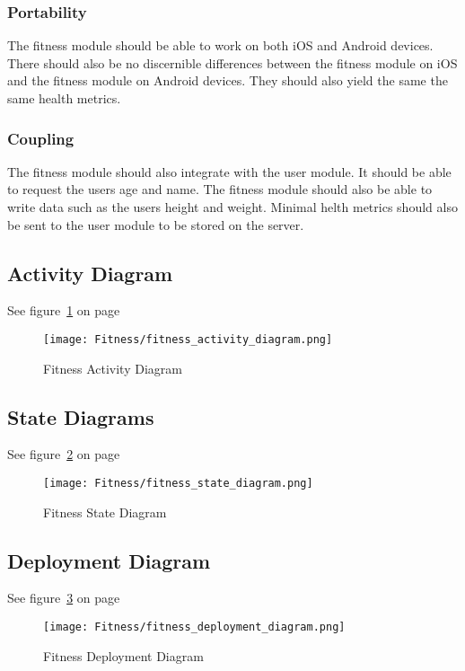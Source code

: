 \subsubsection{Portability} 
The fitness module should be able to work on both iOS and Android devices. There should also be no discernible differences between the fitness module on iOS and the fitness module on Android devices. They should also yield the same the same health metrics. 

\subsubsection{Coupling} 
The fitness module should also integrate with the user module. It should be able to request the users age and name. The fitness module should also be able to write data such as the users height and weight. Minimal helth metrics should also be sent to the user module to be stored on the server. 


\subsection{Activity Diagram}
See figure~\ref{fig:fitness_activity_diagram} on page~\pageref{fig:fitness_activity_diagram}
\begin{figure}
	\centering
	\texttt{[image: Fitness/fitness\_activity\_diagram.png]}
	\caption{Fitness Activity Diagram}
	\label{fig:fitness_activity_diagram}
\end{figure}

\subsection{State Diagrams}
See figure~\ref{fig:fitness_state_diagram} on page~\pageref{fig:fitness_state_diagram}
\begin{figure}
	\centering
	\texttt{[image: Fitness/fitness\_state\_diagram.png]}
	\caption{Fitness State Diagram}
	\label{fig:fitness_state_diagram}
\end{figure}

\subsection{Deployment Diagram}
See figure~\ref{fig:fitness_deployment_diagram} on page~\pageref{fig:fitness_deployment_diagram}
\begin{figure}
	\centering
	\texttt{[image: Fitness/fitness\_deployment\_diagram.png]}
	\caption{Fitness Deployment Diagram}
	\label{fig:fitness_deployment_diagram}
\end{figure}